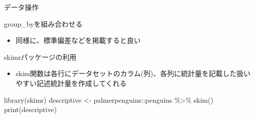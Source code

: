 \documentclass[
  ignorenonframetext,
]{beamer}
\newenvironment{Shaded}{\begin{snugshade}}{\end{snugshade}}
\newcommand{\FunctionTok}[1]{\textcolor[rgb]{0.00,0.00,0.00}{#1}}
\newcommand{\NormalTok}[1]{#1}
\newcommand{\OtherTok}[1]{\textcolor[rgb]{0.56,0.35,0.01}{#1}}
\newcommand{\SpecialCharTok}[1]{\textcolor[rgb]{0.00,0.00,0.00}{#1}}
\providecommand{\tightlist}{%
  \setlength{\itemsep}{0pt}\setlength{\parskip}{0pt}}
\begin{document}
\begin{frame}[fragile]{データ操作}
\begin{block}{group\_byを組み合わせる}
\begin{itemize}
\tightlist
\item
  同様に、標準偏差などを掲載すると良い
\end{itemize}
\end{block}

\begin{block}{skimrパッケージの利用}
\protect\hypertarget{skimrux30d1ux30c3ux30b1ux30fcux30b8ux306eux5229ux7528}{}
\begin{itemize}
\tightlist
\item
  skim関数は各行にデータセットのカラム(列)、各列に統計量を記載した扱いやすい記述統計量を作成してくれる
\end{itemize}

\begin{Shaded}
\begin{Highlighting}[]
\FunctionTok{library}\NormalTok{(skimr)}
\NormalTok{descriptive }\OtherTok{\textless{}{-}}\NormalTok{ palmerpenguins}\SpecialCharTok{::}\NormalTok{penguins }\SpecialCharTok{\%\textgreater{}\%}
  \FunctionTok{skim}\NormalTok{()}
\FunctionTok{print}\NormalTok{(descriptive)}
\end{Highlighting}
\end{Shaded}


\end{block}
\end{frame}
\end{document}
